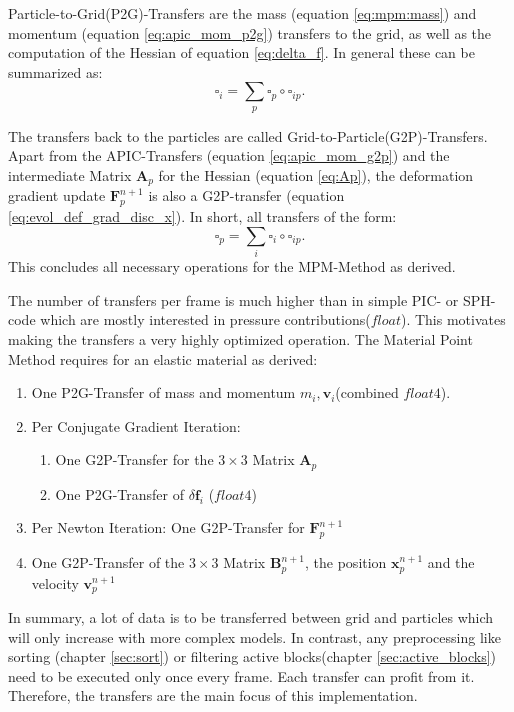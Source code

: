 \documentclass[m,times]{cgMA}
\begin{document}
Particle-to-Grid(P2G)-Transfers are the mass (equation \ref{eq:mpm:mass}) and momentum (equation \ref{eq:apic_mom_p2g}) transfers to the grid, as well as the computation of the Hessian of equation \ref{eq:delta_f}. In general these can be summarized as:
$$\square_i = \sum_p \square_p \circ \square_{ip}.$$

The transfers back to the particles are called Grid-to-Particle(G2P)-Transfers. Apart from the APIC-Transfers (equation \ref{eq:apic_mom_g2p}) and the intermediate Matrix $\boldsymbol{A}_p$ for the Hessian (equation \ref{eq:Ap}), the deformation gradient update $\boldsymbol{F}^{n+1}_p$ is also a G2P-transfer (equation \ref{eq:evol_def_grad_disc_x}). In short, all transfers of the form:
$$\square_p = \sum_i \square_i \circ \square_{ip}.$$
This concludes all necessary operations for the MPM-Method as derived.

The number of transfers per frame is much higher than in simple PIC- or SPH-code which are mostly interested in pressure contributions($float$). This motivates making the transfers a very highly optimized operation. The Material Point Method requires for an elastic material as derived:
\begin{enumerate}
  \item One P2G-Transfer of mass and momentum $m_i, \boldsymbol{v}_i$(combined $float4$).
  \item Per Conjugate Gradient Iteration:
    \begin{enumerate}
      \item One G2P-Transfer for the $3 \times 3$ Matrix $\boldsymbol{A}_p$
      \item One P2G-Transfer of $\delta \boldsymbol{f}_i$ ($float4$)
    \end{enumerate}
  \item Per Newton Iteration: One G2P-Transfer for $\boldsymbol{F}^{n+1}_p$
  \item One G2P-Transfer of the $3 \times 3$ Matrix $\boldsymbol{B}_p^{n+1}$, the position $\boldsymbol{x}_p^{n+1}$ and the velocity $\boldsymbol{v}_p^{n+1}$
\end{enumerate}
In summary, a lot of data is to be transferred between grid and particles which will only increase with more complex models. In contrast, any preprocessing like sorting (chapter \ref{sec:sort}) or filtering active blocks(chapter \ref{sec:active_blocks}) need to be executed only once every frame. Each transfer can profit from it. Therefore, the transfers are the main focus of this implementation.
\end{document}

